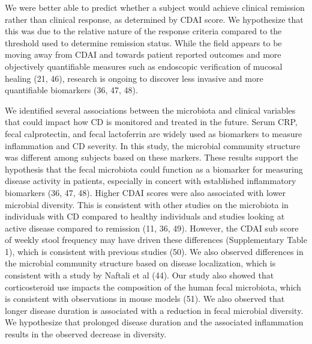 \documentclass[12pt,]{article}
\begin{document}
We were better able to predict whether a subject would achieve clinical
remission rather than clinical response, as determined by CDAI score. We
hypothesize that this was due to the relative nature of the response
criteria compared to the threshold used to determine remission status.
While the field appears to be moving away from CDAI and towards patient
reported outcomes and more objectively quantifiable measures such as
endoscopic verification of mucosal healing (21, 46), research is ongoing
to discover less invasive and more quantifiable biomarkers (36, 47, 48).

We identified several associations between the microbiota and clinical
variables that could impact how CD is monitored and treated in the
future. Serum CRP, fecal calprotectin, and fecal lactoferrin are widely
used as biomarkers to measure inflammation and CD severity. In this
study, the microbial community structure was different among subjects
based on these markers. These results support the hypothesis that the
fecal microbiota could function as a biomarker for measuring disease
activity in patients, especially in concert with established
inflammatory biomarkers (36, 47, 48). Higher CDAI scores were also
associated with lower microbial diversity. This is consistent with other
studies on the microbiota in individuals with CD compared to healthy
individuals and studies looking at active disease compared to remission
(11, 36, 49). However, the CDAI sub score of weekly stool frequency may
have driven these differences (Supplementary Table 1), which is
consistent with previous studies (50). We also observed differences in
the microbial community structure based on disease localization, which
is consistent with a study by Naftali et al (44). Our study also showed
that corticosteroid use impacts the composition of the human fecal
microbiota, which is consistent with observations in mouse models (51).
We also observed that longer disease duration is associated with a
reduction in fecal microbial diversity. We hypothesize that prolonged
disease duration and the associated inflammation results in the observed
decrease in diversity.
\end{document}
